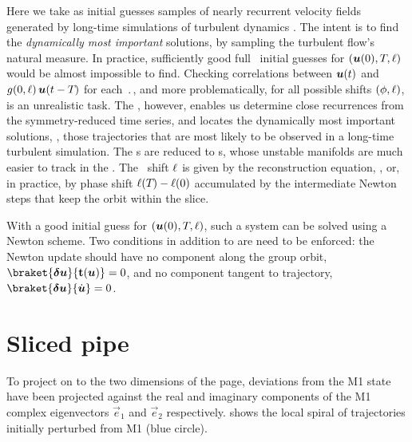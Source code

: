 \documentclass{jfm}
\begin{document}
Here we take as initial guesses samples of nearly recurrent velocity
fields generated by long-time simulations of turbulent dynamics
\citep{pchaot,CviGib10}. The intent is to find the {\em dynamically most
important} solutions, by sampling the turbulent flow's natural measure.
In practice, sufficiently good full \statesp\ initial guesses for
$(\mbox{\boldmath $u$}(0),{T_{}},\ell)$ would be almost impossible to find.
Checking correlations between $\mbox{\boldmath $u$}(t)$ and
$g(0,\ell)\,\mbox{\boldmath $u$}(t-{T_{}})$ for each $\period{}$, and
more problematically, for all possible shifts $(\phi,\ell)$, is an
unrealistic task. The \mslices, however, enables us determine close
recurrences  from the symmetry-reduced time series, and locates the
dynamically most important solutions, \ie, those trajectories that are
most likely to be observed in a long-time turbulent simulation. The \rpo
s are reduced to \po s, whose unstable manifolds are much easier to track
in the \reducedsp. The \rpo\ shift $\ell$ is given by the
reconstruction equation, , or, in practice, by phase
shift $\ell({T_{}})-\ell(0)$ accumulated by the intermediate
Newton steps that keep the orbit within the slice.

With a good initial guess for $(\mbox{\boldmath $u$}(0),{T_{}},\ell)$, such a
system can be solved using a Newton scheme.  Two conditions in addition
to  are need to be enforced: the Newton update should have no
component along the group orbit, $\braket{\vec{\delta
u}}{\groupTan(\vec{u})}=0$, and no component tangent to trajectory,
$\braket{\vec{\delta u}}{\dot{\vec{u}}}=0$.

\section{Sliced pipe}
\label{s:slicedWurst}


To project on to the two dimensions of the page,
deviations from the M1 state have been projected against the
real and imaginary components of the M1 complex eigenvectors
$\vec{e}_1$ and $\vec{e}_2$ respectively.
 shows the local spiral of trajectories
initially perturbed from M1 (blue circle).
\end{document}
